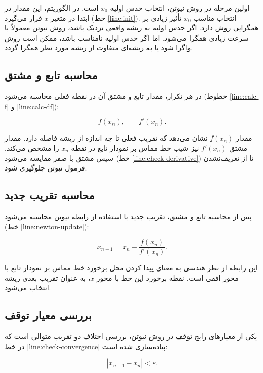 اولین مرحله در روش نیوتن، انتخاب حدس اولیه \(x_0\) است. در الگوریتم، این مقدار در ابتدا در متغیر \(x\) قرار می‌گیرد (خط \ref{line:init}). انتخاب مناسب \(x_0\) تأثیر زیادی بر همگرایی روش دارد. اگر حدس اولیه به ریشه واقعی نزدیک باشد، روش نیوتن معمولاً با سرعت زیادی همگرا می‌شود. اما اگر حدس اولیه نامناسب باشد، ممکن است روش واگرا شود یا به ریشه‌ای متفاوت از ریشه مورد نظر همگرا گردد.

\subsection{محاسبه تابع و مشتق}

در هر تکرار، مقدار تابع و مشتق آن در نقطه فعلی محاسبه می‌شود (خطوط \ref{line:calc-f} و \ref{line:calc-df}):

\begin{equation}
f(x_n), \qquad f'(x_n).
\label{eq:function-derivative-ch3}
\end{equation}

مقدار \(f(x_n)\) نشان می‌دهد که تقریب فعلی تا چه اندازه از ریشه فاصله دارد. مقدار مشتق \(f'(x_n)\) نیز شیب خط مماس بر نمودار تابع در نقطه \(x_n\) را مشخص می‌کند. سپس مشتق با صفر مقایسه می‌شود (خط \ref{line:check-derivative}) تا از تعریف‌نشدن فرمول نیوتن جلوگیری شود.

\subsection{محاسبه تقریب جدید}

پس از محاسبه تابع و مشتق، تقریب جدید با استفاده از رابطه نیوتن محاسبه می‌شود (خط \ref{line:newton-update}):

\begin{equation}
x_{n+1}=x_n-\frac{f(x_n)}{f'(x_n)}.
\label{eq:newton-update-ch3}
\end{equation}

این رابطه از نظر هندسی به معنای پیدا کردن محل برخورد خط مماس بر نمودار تابع با محور افقی است. نقطه برخورد این خط با محور \(x\)، به عنوان تقریب بعدی ریشه انتخاب می‌شود.

\subsection{بررسی معیار توقف}

یکی از معیارهای رایج توقف در روش نیوتن، بررسی اختلاف دو تقریب متوالی است که در خط \ref{line:check-convergence} پیاده‌سازی شده است:

\begin{equation}
|x_{n+1}-x_n|<\varepsilon.
\label{eq:stopping-difference-ch3}
\end{equation}

